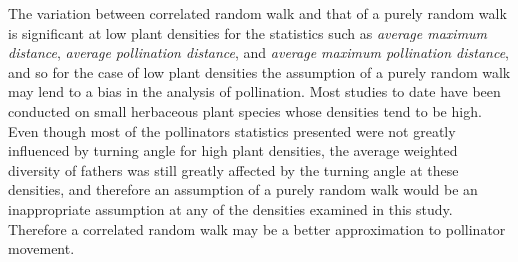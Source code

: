 The variation between correlated random walk and that of a purely random walk is
significant at low plant densities for the statistics such as \emph{average
maximum distance}, \emph{average pollination distance}, and \emph{average
maximum pollination distance}, and so for the case of low plant densities the
assumption of a purely random walk may lend to a bias in the analysis of
pollination. Most studies to date have been conducted on small herbaceous plant
species whose densities tend to be high. Even though most of the pollinators
statistics presented were not greatly influenced by turning angle for high plant
densities, the average weighted diversity of fathers was still greatly affected
by the turning angle at these densities, and therefore an assumption of a purely
random walk would be an inappropriate assumption at any of the densities
examined in this study. Therefore a correlated random walk may be a better
approximation to pollinator movement.
